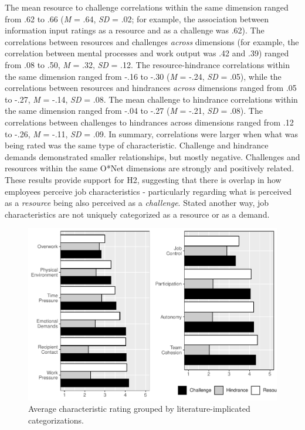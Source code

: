 \documentclass[
  man,mask]{apa6}
\begin{document}
The mean resource to challenge correlations within the same dimension ranged from .62 to .66 (\emph{M} = .64, \emph{SD} = .02; for example, the association between information input ratings as a resource and as a challenge was .62). The correlations between resources and challenges \emph{across} dimensions (for example, the correlation between mental processes and work output was .42 and .39) ranged from .08 to .50, \emph{M} = .32, \emph{SD} = .12. The resource-hindrance correlations within the same dimension ranged from -.16 to -.30 (\emph{M} = -.24, \emph{SD} = .05), while the correlations between resources and hindrances \emph{across} dimensions ranged from .05 to -.27, \emph{M} = -.14, \emph{SD} = .08. The mean challenge to hindrance correlations within the same dimension ranged from -.04 to -.27 (\emph{M} = -.21, \emph{SD} = .08). The correlations between challenges to hindrances across dimensions ranged from .12 to -.26, \emph{M} = -.11, \emph{SD} = .09. In summary, correlations were larger when what was being rated was the same type of characteristic. Challenge and hindrance demands demonstrated smaller relationships, but mostly negative. Challenges and resources within the same O*Net dimensions are strongly and positively related. These results provide support for H2, suggesting that there is overlap in how employees perceive job characteristics - particularly regarding what is perceived as a \emph{resource} being also perceived as a \emph{challenge}. Stated another way, job characteristics are not uniquely categorized as a resource or as a demand.

\begin{figure}
\centering
\includegraphics{Submission_files/figure-latex/scalelevelgraphs-1.pdf}
\caption{\label{fig:scalelevelgraphs}Average characteristic rating grouped by literature-implicated categorizations.}
\end{figure}
\end{document}
